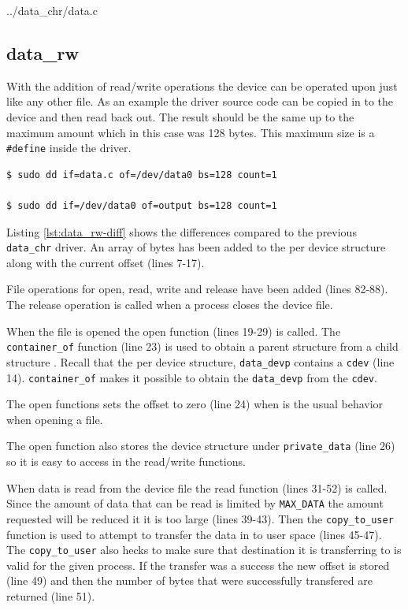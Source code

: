 \documentclass{article}
\begin{document}
\pagebreak

	{../data_chr/data.c}



\clearpage
\subsection{data\_rw}
\label{sec:data_rw}

With the addition of read/write operations the device can be
operated upon just like any other file.
As an example the driver source code can be copied in to the
device and then read back out.
The result should be the same up to the maximum amount which
in this case was 128 bytes.
This maximum size is a \verb+#define+ inside the driver.

\begin{verbatim}
$ sudo dd if=data.c of=/dev/data0 bs=128 count=1

$ sudo dd if=/dev/data0 of=output bs=128 count=1
\end{verbatim}

Listing \ref{lst:data_rw-diff} shows the differences compared to the
previous \verb+data_chr+ driver.  An array of bytes has been added
to the per device structure along with the current offset (lines 7-17).

File operations for open, read, write and release have been added (lines 82-88).
The release operation is called when a process closes the device file.

When the file is opened the open function (lines 19-29) is called.
The \verb+container_of+ function (line 23) is used to obtain a parent
structure from a child structure\autocite[Pg. 79]{corbet2009linux}
\autocite{kroah2005cont}.
Recall that the per device structure, \verb+data_devp+ contains a
\verb+cdev+ (line 14).
\verb+container_of+ makes it possible to obtain the \verb+data_devp+
from the \verb+cdev+.

The open functions sets the offset to zero (line 24) when is the usual
behavior when opening a file.

The open function also stores the device structure under \verb+private_data+
(line 26) so it is easy to access in the read/write functions.

When data is read from the device file the read function (lines 31-52)
is called.
Since the amount of data that can be read is limited by \verb+MAX_DATA+
the amount requested will be reduced it it is too large (lines 39-43).
Then the \verb+copy_to_user+ function is used to attempt to transfer
the data in to user space (lines 45-47).
The \verb+copy_to_user+ also hecks to make sure that destination it is
transferring to is valid for the given process.
If the transfer was a success the new offset is stored (line 49)
and then the number of bytes that were successfully transfered are
returned (line 51).
\end{document}
